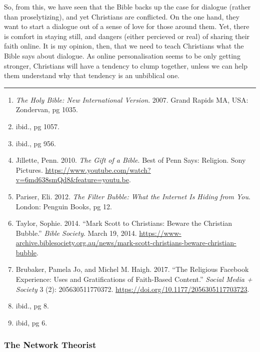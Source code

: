 \documentclass[]{article}
\providecommand{\tightlist}{%
  \setlength{\itemsep}{0pt}\setlength{\parskip}{0pt}}
\begin{document}
So, from this, we have seen that the Bible backs up the case for
dialogue (rather than proselytizing), and yet Christians are conflicted.
On the one hand, they want to start a dialogue out of a sense of love
for those around them. Yet, there is comfort in staying still, and
dangers (either percieved or real) of sharing their faith online. It is
my opinion, then, that we need to teach Christians what the Bible says
about dialogue. As online personalisation seems to be only getting
stronger, Christians will have a tendency to clump together, unless we
can help them understand why that tendency is an unbiblical one.

\begin{center}\rule{0.5\linewidth}{\linethickness}\end{center}

\begin{enumerate}
\def\labelenumi{\arabic{enumi}.}
\setcounter{enumi}{11}
\tightlist
\item
  \emph{The Holy Bible: New International Version}. 2007. Grand Rapids
  MA, USA: Zondervan, pg 1035.
\item
  ibid., pg 1057.
\item
  ibid., pg 956.
\item
  Jillette, Penn. 2010. \emph{The Gift of a Bible}. Best of Penn Says:
  Religion. Sony Pictures.
  \url{https://www.youtube.com/watch?v=6md638smQd8\&feature=youtu.be}.
\item
  Pariser, Eli. 2012. \emph{The Filter Bubble: What the Internet Is
  Hiding from You}. London: Penguin Books, pg 12.
\item
  Taylor, Sophie. 2014. ``Mark Scott to Christians: Beware the Christian
  Bubble.'' \emph{Bible Society}. March 19, 2014.
  \url{https://www-archive.biblesociety.org.au/news/mark-scott-christians-beware-christian-bubble}.
\item
  Brubaker, Pamela Jo, and Michel M. Haigh. 2017. ``The Religious
  Facebook Experience: Uses and Gratifications of Faith-Based Content.''
  \emph{Social Media + Society} 3 (2): 205630511770372.
  \url{https://doi.org/10.1177/2056305117703723}.
\item
  ibid., pg 8.
\item
  ibid, pg 6.
\end{enumerate}

\hypertarget{the-network-theorist}{%
\subsubsection{The Network Theorist}\label{the-network-theorist}}
\end{document}
